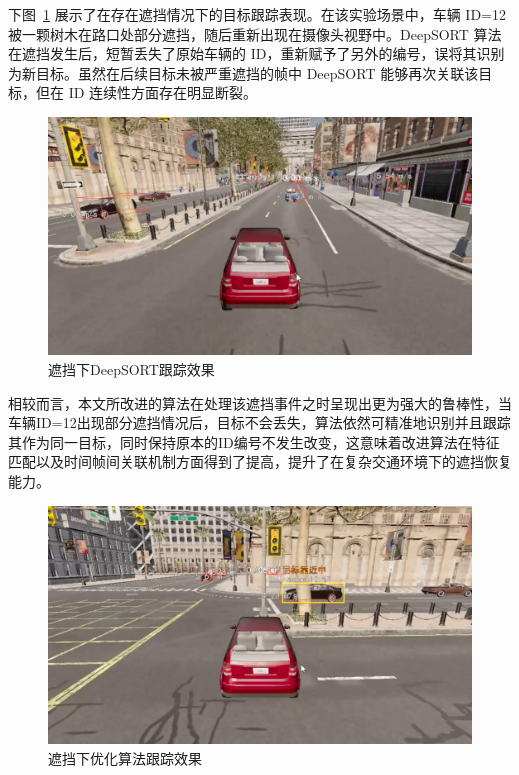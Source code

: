 下图~\ref{fig:covered1} 展示了在存在遮挡情况下的目标跟踪表现。在该实验场景中，车辆 ID=12被一颗树木在路口处部分遮挡，随后重新出现在摄像头视野中。DeepSORT 算法在遮挡发生后，短暂丢失了原始车辆的 ID，重新赋予了另外的编号，误将其识别为新目标。虽然在后续目标未被严重遮挡的帧中 DeepSORT 能够再次关联该目标，但在 ID 连续性方面存在明显断裂。
\begin{figure}[H]
	\centering
	\includegraphics[width=1.0\textwidth]{images/遮挡未跟踪.pdf}  %
	\caption{遮挡下DeepSORT跟踪效果}
	\label{fig:covered1}  %
\end{figure}

相较而言，本文所改进的算法在处理该遮挡事件之时呈现出更为强大的鲁棒性，当车辆ID=12出现部分遮挡情况后，目标不会丢失，算法依然可精准地识别并且跟踪其作为同一目标，同时保持原本的ID编号不发生改变，这意味着改进算法在特征匹配以及时间帧间关联机制方面得到了提高，提升了在复杂交通环境下的遮挡恢复能力。
\begin{figure}[H]
	\centering
	\includegraphics[width=1.0\textwidth]{images/遮挡已跟踪.pdf}  %
	\caption{遮挡下优化算法跟踪效果}
	\label{fig:covered2}  %
\end{figure}

